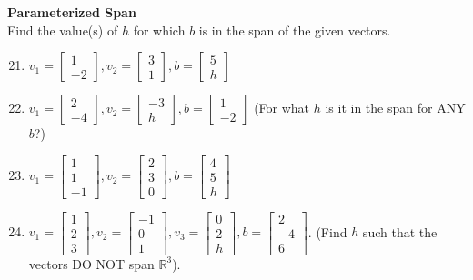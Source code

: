 \documentclass[12pt]{article}
\begin{document}
\textbf{Parameterized Span} \\
Find the value(s) of $h$ for which $b$ is in the span of the given vectors.
\begin{enumerate}
\setcounter{enumi}{20}
    \item $v_1 = \begin{bmatrix} 1 \\ -2 \end{bmatrix}, v_2 = \begin{bmatrix} 3 \\ 1 \end{bmatrix}, b = \begin{bmatrix} 5 \\ h \end{bmatrix}$
    \item $v_1 = \begin{bmatrix} 2 \\ -4 \end{bmatrix}, v_2 = \begin{bmatrix} -3 \\ h \end{bmatrix}, b = \begin{bmatrix} 1 \\ -2 \end{bmatrix}$ (For what $h$ is it in the span for ANY $b$?)
    \item $v_1 = \begin{bmatrix} 1 \\ 1 \\ -1 \end{bmatrix}, v_2 = \begin{bmatrix} 2 \\ 3 \\ 0 \end{bmatrix}, b = \begin{bmatrix} 4 \\ 5 \\ h \end{bmatrix}$
    \item $v_1 = \begin{bmatrix} 1 \\ 2 \\ 3 \end{bmatrix}, v_2 = \begin{bmatrix} -1 \\ 0 \\ 1 \end{bmatrix}, v_3 = \begin{bmatrix} 0 \\ 2 \\ h \end{bmatrix}, b = \begin{bmatrix} 2 \\ -4 \\ 6 \end{bmatrix}$. (Find $h$ such that the vectors DO NOT span $\mathbb{R}^3$).
\end{enumerate}
\end{document}
